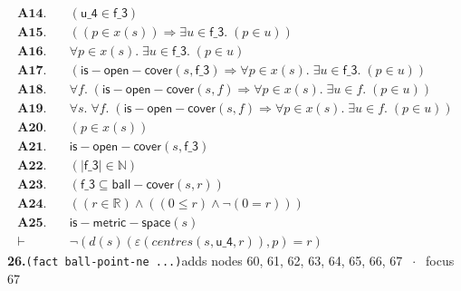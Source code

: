 \documentclass[11pt]{article}
\begin{document}
\begin{align*}
  \mathbf{A14.}\quad & (\mathsf{u\_4} \in \mathsf{f\_3}) \\
  \mathbf{A15.}\quad & ((p \in x(s)) \Rightarrow \exists u \in \mathsf{f\_3}.\; (p \in u)) \\
  \mathbf{A16.}\quad & \forall p \in x(s).\; \exists u \in \mathsf{f\_3}.\; (p \in u) \\
  \mathbf{A17.}\quad & (\mathsf{is{-}open{-}cover}(s, \mathsf{f\_3}) \Rightarrow \forall p \in x(s).\; \exists u \in \mathsf{f\_3}.\; (p \in u)) \\
  \mathbf{A18.}\quad & \forall f.\; (\mathsf{is{-}open{-}cover}(s, f) \Rightarrow \forall p \in x(s).\; \exists u \in f.\; (p \in u)) \\
  \mathbf{A19.}\quad & \forall s.\; \forall f.\; (\mathsf{is{-}open{-}cover}(s, f) \Rightarrow \forall p \in x(s).\; \exists u \in f.\; (p \in u)) \\
  \mathbf{A20.}\quad & (p \in x(s)) \\
  \mathbf{A21.}\quad & \mathsf{is{-}open{-}cover}(s, \mathsf{f\_3}) \\
  \mathbf{A22.}\quad & (|\mathsf{f\_3}| \in \mathbb{N}) \\
  \mathbf{A23.}\quad & (\mathsf{f\_3} \subseteq \mathsf{ball{-}cover}(s, r)) \\
  \mathbf{A24.}\quad & ((r \in \mathbb{R}) \wedge ((0 \leq r) \wedge \neg (0 = r))) \\
  \mathbf{A25.}\quad & \mathsf{is{-}metric{-}space}(s) \\
  \vdash\quad & \neg (d(s)(\varepsilon(\mathit{centres}(s, \mathsf{u\_4}, r)), p) = r)
\end{align*}
\medskip\noindent\textbf{26.}\quad \texttt{(fact ball-point-ne ...)}\hfill{\small adds nodes 60, 61, 62, 63, 64, 65, 66, 67 $\;\cdot\;$ focus 67}\\[2pt]
\end{document}
